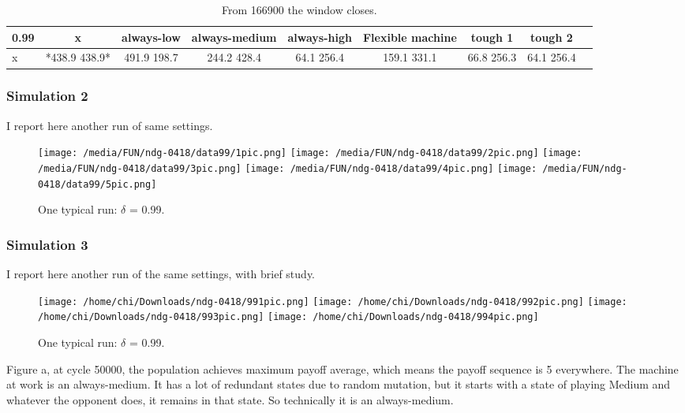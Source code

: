 \documentclass[12.5pt]{report}
\begin{document}
\begin{table}[h!]
\center
\begin{tabular}{l|cccccccc}
\textbf{0.99}& x & always-low & always-medium & always-high & Flexible machine &tough 1 & tough 2\\
\hline
x& *438.9 438.9* &  491.9 198.7  &  244.2 428.4   & 64.1 256.4 &    159.1 331.1 &   66.8 256.3 &    64.1 256.4\\

\end{tabular}
\caption{From 166900 the window closes.}
\end{table}



\subsubsection{Simulation 2}

I report here another run of same settings.

\begin{figure}
\texttt{[image: /media/FUN/ndg-0418/data99/1pic.png]}
\texttt{[image: /media/FUN/ndg-0418/data99/2pic.png]}
\texttt{[image: /media/FUN/ndg-0418/data99/3pic.png]}
\texttt{[image: /media/FUN/ndg-0418/data99/4pic.png]}
\texttt{[image: /media/FUN/ndg-0418/data99/5pic.png]}
\caption{One typical run: $\delta$ = 0.99.}
\end{figure}


\subsubsection{Simulation 3}

I report here another run of the same settings, with brief study.

\begin{figure}

\texttt{[image: /home/chi/Downloads/ndg-0418/991pic.png]}
\texttt{[image: /home/chi/Downloads/ndg-0418/992pic.png]}
\texttt{[image: /home/chi/Downloads/ndg-0418/993pic.png]}
\texttt{[image: /home/chi/Downloads/ndg-0418/994pic.png]}

\caption{One typical run: $\delta$ = 0.99.}
\end{figure}

Figure a, at cycle 50000, the population achieves maximum payoff average, which means the payoff sequence is 5 everywhere. The machine at work is an always-medium. It has a lot of redundant states due to random mutation, but it starts with a state of playing Medium and whatever the opponent does, it remains in that state. So technically it is an always-medium.\\
\end{document}
